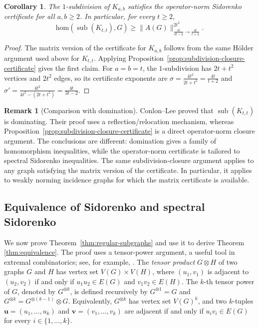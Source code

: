 \documentclass[11pt]{article}
\newtheorem{corollary}[theorem]{Corollary}
\theoremstyle{definition}
\newtheorem{remark}{Remark}
\theoremstyle{plain}
\newcommand{\homc}{\mathrm{hom}}
\begin{document}
\begin{corollary}
The \(1\)-subdivision of \(K_{a,b}\) satisfies the operator-norm
Sidorenko certificate for all \(a,b\ge2\).  In particular, for every \(t\ge2\),
\[
        \homc(\operatorname{sub}(K_{t,t}),G)
        \ge
        \|A(G)\|_{\frac{4t}{3t-2}\to \frac{4t}{t+2}}^{2t^2}.
\]
\end{corollary}

\begin{proof}
The matrix version of the certificate for \(K_{a,b}\) follows from the
same H\"older argument used above for \(K_{t,t}\).  Applying
Proposition~\ref{prop:subdivision-closure-certificate} gives the first
claim.  For \(a=b=t\), the \(1\)-subdivision has \(2t+t^2\) vertices and
\(2t^2\) edges, so its certificate exponents are
$\sigma=\frac{4t^2}{2t+t^2}=\frac{4t}{t+2}$ and $       \sigma'=\frac{4t^2}{4t^2-(2t+t^2)}
        =
        \frac{4t}{3t-2}.$
\end{proof}

\begin{remark}[Comparison with domination]
Conlon--Lee proved that \(\operatorname{sub}(K_{t,t})\) is dominating.
Their proof uses a reflection/relocation mechanism, whereas
Proposition~\ref{prop:subdivision-closure-certificate} is a direct
operator-norm closure argument.  The conclusions are different:
domination gives a family of homomorphism inequalities, while the
operator-norm certificate is tailored to spectral Sidorenko inequalities.
The same subdivision-closure argument applies to any graph satisfying the
matrix version of the certificate.  In particular, it applies to weakly norming incidence graphs for which the matrix certificate is available. 
\end{remark}


\subsection{Equivalence of Sidorenko and spectral Sidorenko}

We now prove Theorem~\ref{thm:regular-subgraphs} and use it to derive Theorem \ref{thm:equivalence}.  The proof uses a tensor-power
argument, a useful tool in extremal combinatorics; see, for example,
\cite{ConlonFoxSudakov2010, FoxLovasz2017Adv, LovaszSauermann2019PLMS,Tao2008TensorPower}. The \emph{tensor product} \(G\otimes H\) of two graphs \(G\) and \(H\)
has vertex set \(V(G)\times V(H)\), where \((u_1,v_1)\) is adjacent to
\((u_2,v_2)\) if and only if \(u_1u_2\in E(G)\) and \(v_1v_2\in E(H)\).
The \(k\)-th tensor power of \(G\), denoted by \(G^{\otimes k}\), is
defined recursively by \(G^{\otimes 1}=G\) and
\(G^{\otimes k}=G^{\otimes(k-1)}\otimes G\).  Equivalently,
\(G^{\otimes k}\) has vertex set \(V(G)^k\), and two \(k\)-tuples
\(\bm u=(u_1,\dots,u_k)\) and \(\bm v=(v_1,\dots,v_k)\) are adjacent if
and only if \(u_i v_i\in E(G)\) for every \(i\in\{1,\dots,k\}\).
\end{document}
